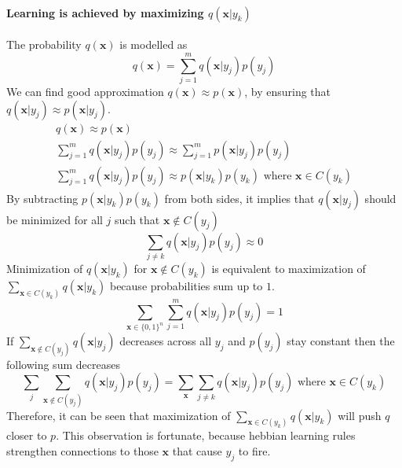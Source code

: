 \documentclass[12pt]{article}
\begin{document}
\paragraph{Learning is achieved by maximizing $q(\boldsymbol{x}|y_k)$}
The probability $q(\boldsymbol{x})$ is modelled as
\[
q(\boldsymbol{x}) = \sum_{j=1}^{m} q(\boldsymbol{x}|y_j)p(y_j)
\]
We can find good approximation $q(\boldsymbol{x})\approx p(\boldsymbol{x})$, by ensuring that $q(\boldsymbol{x}|y_j)\approx p(\boldsymbol{x}|y_j)$. 
\begin{gather*}
	q(\boldsymbol{x}) \approx p(\boldsymbol{x}) \\
	\sum_{j=1}^{m} q(\boldsymbol{x}|y_j)p(y_j) \approx \sum_{j=1}^{m} p(\boldsymbol{x}|y_j)p(y_j) \\
	\sum_{j=1}^{m} q(\boldsymbol{x}|y_j)p(y_j)  \approx p(\boldsymbol{x}|y_k)p(y_k) \text{ where }\boldsymbol{x}\in C(y_k)
\end{gather*}
By subtracting $p(\boldsymbol{x}|y_k)p(y_k)$ from both sides, it implies that $ q(\boldsymbol{x}|y_j)$ should be minimized for all $j$ such that $\boldsymbol{x}\notin C(y_j)$
\[
	\sum_{j\ne k} q(\boldsymbol{x}|y_j)p(y_j) \approx 0 
\]
Minimization of $q(\boldsymbol{x}|y_k)$ for $\boldsymbol{x}\notin C(y_k)$ is equivalent to maximization of $\sum_{\boldsymbol{x}\in C(y_k)}q(\boldsymbol{x}|y_k)$ because probabilities sum up to $1$. 
\[
\sum_{\boldsymbol{x}\in\{0,1\}^n} \sum_{j=1}^{m} q(\boldsymbol{x}|y_j)p(y_j) = 1
\]
If $\sum_{\boldsymbol{x}\notin C(y_j)} q(\boldsymbol{x}|y_j)$ decreases across all $y_j$ and $p(y_j)$ stay constant then the following sum decreases
\[
\sum_{j} \sum_{\boldsymbol{x}\notin C(y_j)} q(\boldsymbol{x}|y_j) p(y_j) = \sum_{\boldsymbol{x}} \sum_{j\ne k}  q(\boldsymbol{x}|y_j) p(y_j) \text{ where }\boldsymbol{x}\in C(y_k)
\]
Therefore, it can be seen that maximization of $\sum_{\boldsymbol{x}\in C(y_k)}q(\boldsymbol{x}|y_k)$ will push $q$ closer to $p$. This observation is fortunate, because hebbian learning rules strengthen connections to those $\boldsymbol{x}$ that cause $y_j$ to fire.
\end{document}
